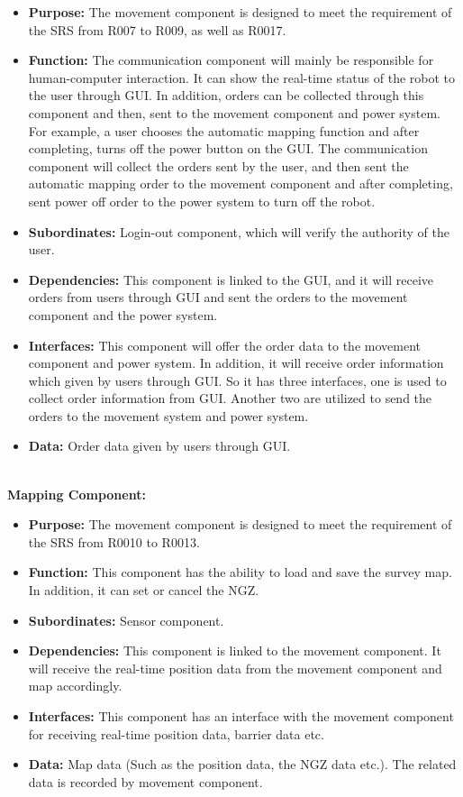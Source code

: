 \documentclass[11pt, a4paper]{article}
\begin{document}
\begin{itemize}
\item {\bfseries Purpose: }The movement component is designed to meet the requirement of the SRS from R007 to R009, as well as R0017.
\item {\bfseries Function: }The communication component will mainly be responsible for human-computer interaction. It can show the real-time status of the robot to the user through GUI. In addition, orders can be collected through this component and then, sent to the movement component and power system. For example, a user chooses the automatic mapping function and after completing, turns off the power button on the GUI. The communication component will collect the orders sent by the user, and then sent the automatic mapping order to the movement component and after completing, sent power off order to the power system to turn off the robot.
\item {\bfseries Subordinates: }Login-out component, which will verify the authority of the user.
\item {\bfseries Dependencies: } This component is linked to the GUI, and it will receive orders from users through GUI and sent the orders to the movement component and the power system.
\item {\bfseries Interfaces: }This component will offer the order data to the movement component and power system. In addition, it will receive order information which given by users through GUI. So it has three interfaces, one is used to collect order information from GUI. Another two are utilized to send the orders to the movement system and power system.
\item {\bfseries Data: }Order data given by users through GUI.
\end{itemize}
\\
\textbf{Mapping Component:}
\begin{itemize}
\item {\bfseries Purpose: }The movement component is designed to meet the requirement of the SRS from R0010 to R0013. 
\item {\bfseries Function: }This component has the ability to load and save the survey map. In addition, it can set or cancel the NGZ.
\item {\bfseries Subordinates: }Sensor component.
\item {\bfseries Dependencies: }This component is linked to the movement component. It will receive the real-time position data from the movement component and map accordingly.
\item {\bfseries Interfaces: }This component has an interface with the movement component for receiving real-time position data, barrier data etc.
\item {\bfseries Data: }Map data (Such as the position data, the NGZ data etc.). The related data is recorded by movement component. 
\end{itemize}
\end{document}
